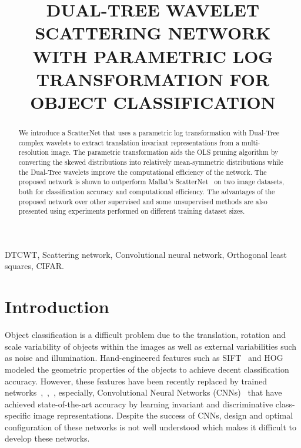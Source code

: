 \documentclass{article}
\title{DUAL-TREE WAVELET SCATTERING NETWORK WITH PARAMETRIC LOG TRANSFORMATION FOR OBJECT CLASSIFICATION}
\begin{document}
\maketitle
\begin{abstract}
We introduce a ScatterNet that uses a parametric log transformation with Dual-Tree complex wavelets to extract translation invariant representations from a multi-resolution image. The parametric transformation aids the OLS pruning algorithm by converting the skewed distributions into relatively mean-symmetric distributions while the Dual-Tree wavelets improve the computational efficiency of the network. The proposed network is shown to outperform Mallat's ScatterNet~\cite{Oyallon2015} on two image datasets, both for classification accuracy and computational efficiency. The advantages of the proposed network over other supervised and some unsupervised methods are also presented using experiments performed on different training dataset sizes.
\end{abstract}
\begin{keywords}
DTCWT, Scattering network, Convolutional neural network, Orthogonal least squares, CIFAR.
\end{keywords}
\section{Introduction}
\label{sec:intro}

Object classification is a difficult problem due to the translation, rotation and scale variability of objects within the images as well as external variabilities such as noise and illumination. Hand-engineered features such as SIFT~\cite{lowe} and HOG~\cite{dalal} modeled the geometric properties of the objects to achieve decent classification accuracy. However, these features have been recently replaced by trained networks~\cite{jia},~\cite{lee},~\cite{NIN}, especially, Convolutional Neural Networks (CNNs)~\cite{NIN} that have achieved state-of-the-art accuracy by learning invariant and discriminative class-specific image representations. Despite the success of CNNs, design and optimal configuration of these networks is not well understood which makes it difficult to develop these networks. 
\end{document}
